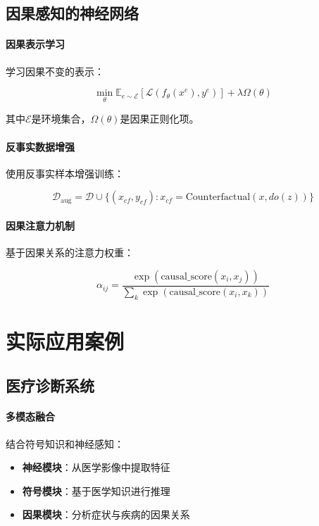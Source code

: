 \subsection{因果感知的神经网络}

\paragraph{因果表示学习}
学习因果不变的表示：

$$\min_{\theta} \mathbb{E}_{e \sim \mathcal{E}} \left[ \mathcal{L}(f_\theta(x^e), y^e) \right] + \lambda \Omega(\theta)$$

其中$\mathcal{E}$是环境集合，$\Omega(\theta)$是因果正则化项。

\paragraph{反事实数据增强}
使用反事实样本增强训练：

$$\mathcal{D}_{\text{aug}} = \mathcal{D} \cup \{(x_{cf}, y_{cf}) : x_{cf} = \text{Counterfactual}(x, do(z))\}$$

\paragraph{因果注意力机制}
基于因果关系的注意力权重：

$$\alpha_{ij} = \frac{\exp(\text{causal\_score}(x_i, x_j))}{\sum_{k} \exp(\text{causal\_score}(x_i, x_k))}$$

\section{实际应用案例}

\subsection{医疗诊断系统}

\paragraph{多模态融合}
结合符号知识和神经感知：

\begin{itemize}
\item \textbf{神经模块}：从医学影像中提取特征
\item \textbf{符号模块}：基于医学知识进行推理
\item \textbf{因果模块}：分析症状与疾病的因果关系
\end{itemize}

